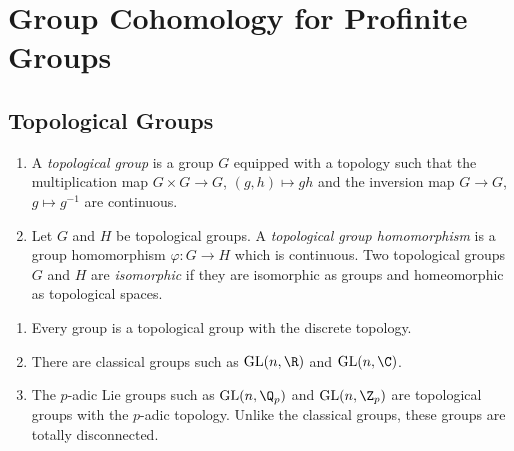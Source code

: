 \newpage
\section{Group Cohomology for Profinite Groups}

\subsection{Topological Groups}

\begin{definition}\noindent
    \begin{enumerate}
        \item A \textit{topological group} is a group $G$ equipped with a topology such that the multiplication map $G \times G \to G$, $(g, h) \mapsto gh$ and the inversion map $G \to G$, $g \mapsto g^{-1}$ are continuous.
        \item Let $G$ and $H$ be topological groups.
        A \textit{topological group homomorphism} is a group homomorphism $\varphi: G \to H$ which is continuous.
        Two topological groups $G$ and $H$ are \textit{isomorphic} if they are isomorphic as groups and homeomorphic as topological spaces. 
    \end{enumerate}
\end{definition}

\begin{example}
    \noindent
    \begin{enumerate}
        \item 
    Every group is a topological group with the discrete topology.
        \item There are classical groups such as $\mathrm{GL}(n, \R)$ and $\mathrm{GL}(n, \C)$.
        \item The $p$-adic Lie groups such as $\mathrm{GL}(n, \Q_p)$ and $\mathrm{GL}(n, \Z_p)$ are topological groups with the $p$-adic topology.
        Unlike the classical groups, these groups are totally disconnected.
    \end{enumerate}
\end{example}


